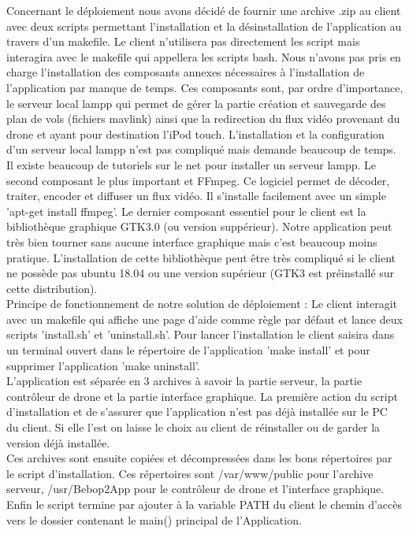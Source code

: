 \documentclass{article}
\begin{document}
	Concernant le déploiement nous avons décidé de fournir une archive .zip au client avec deux scripts permettant l'installation et la désinstallation de l'application au travers d'un makefile. Le client n'utilisera pas directement les script mais interagira avec le makefile qui appellera les scripts bash. Nous n'avons pas pris en charge l'installation des composants annexes nécessaires à l'installation de l'application par manque de temps. Ces composants sont, par ordre d'importance, le serveur local lampp qui permet de gérer la partie création et sauvegarde des plan de vols (fichiers mavlink) ainsi que la redirection du flux vidéo provenant du drone et ayant pour destination l'iPod touch. L'installation et la configuration d'un serveur local lampp n'est pas compliqué mais demande beaucoup de temps. Il existe beaucoup de tutoriels sur le net pour installer un serveur lampp. Le second composant le plus important et FFmpeg. Ce logiciel permet de décoder, traiter, encoder et diffuser un flux vidéo. Il s'installe facilement avec un simple 'apt-get install ffmpeg'. Le dernier composant essentiel pour le client est la bibliothèque graphique GTK3.0 (ou version suppérieur). Notre application peut très bien tourner sans aucune interface graphique mais c'est beaucoup moins pratique. L'installation de cette bibliothèque peut être très compliqué si le client ne possède pas ubuntu 18.04 ou une version supérieur (GTK3 est préinstallé sur cette distribution).\\

Principe de fonctionnement de notre solution de déploiement :
Le client interagit avec un makefile qui affiche une page d'aide comme règle par défaut et lance deux scripts 'install.sh' et 'uninstall.sh'. Pour lancer l'installation le client saisira dans un terminal ouvert dans le répertoire de l'application 'make install' et pour supprimer l'application 'make uninstall'.\\
L'application est séparée en 3 archives à savoir la partie serveur, la partie contrôleur de drone et la partie interface graphique. La première action du script d'installation et de s'assurer que l'application n'est pas déjà installée sur le PC du client. Si elle l'est on laisse le choix au client de réinstaller ou de garder la version déjà installée.\\
Ces archives sont ensuite copiées et décompressées dans les bons répertoires par le script d'installation. Ces répertoires sont /var/www/public pour l'archive serveur, /usr/Bebop2App pour le contrôleur de drone et l'interface graphique.
Enfin le script termine par ajouter à la variable PATH du client le chemin d'accès vers le dossier contenant le main() principal de l'Application.\\
\end{document}

